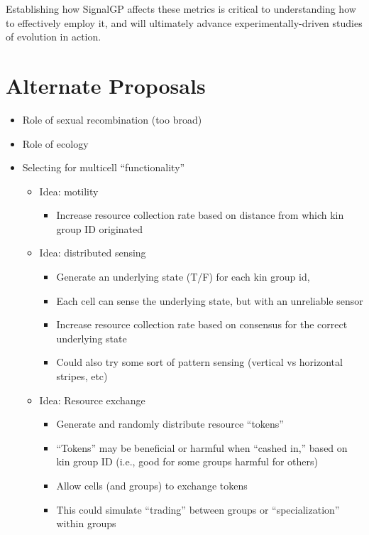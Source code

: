 Establishing how SignalGP affects these metrics is critical to understanding how to effectively employ it, and will ultimately advance experimentally-driven studies of evolution in action.

\section{Alternate Proposals}

\begin{itemize}
  \item Role of sexual recombination (too broad)
  \item Role of ecology
  \item Selecting for multicell ``functionality''
  \begin{itemize}
    \item Idea: motility
    \begin{itemize}
      \item Increase resource collection rate based on distance from which kin group ID originated
    \end{itemize}
    \item Idea: distributed sensing
    \begin{itemize}
      \item Generate an underlying state (T/F) for each kin group id,
      \item Each cell can sense the underlying state, but with an unreliable sensor
      \item Increase resource collection rate based on consensus for the correct underlying state
      \item Could also try some sort of pattern sensing (vertical vs horizontal stripes, etc)
    \end{itemize}
    \item Idea: Resource exchange
    \begin{itemize}
      \item Generate and randomly distribute resource ``tokens''
      \item ``Tokens'' may be beneficial or harmful when ``cashed in,'' based on kin group ID (i.e., good for some groups harmful for others)
      \item Allow cells (and groups) to exchange tokens
      \item This could simulate “trading” between groups or “specialization” within groups
    \end{itemize}
  \end{itemize}
\end{itemize}
